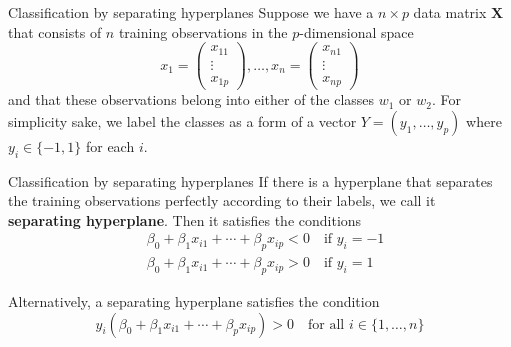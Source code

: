 \documentclass{beamer}
\begin{document}
\begin{frame}{Classification by separating hyperplanes}
	Suppose we have a $n\times p$ data matrix $\mathbf{X}$ that consists of $n$ training observations in the $p$-dimensional space
	\begin{equation*}
		x_1 = \begin{pmatrix}
			x_{11}\\ \vdots \\x_{1p} 
		\end{pmatrix}, \ldots, 
	x_n = \begin{pmatrix}
		x_{n1}\\ \vdots \\x_{np} 
	\end{pmatrix}
	\end{equation*}
and that these observations belong into either of the classes $w_1$ or $w_2$. For simplicity sake, we label the classes as a form of a  vector $Y=(y_1,\ldots,y_p)$ where $y_i \in \{-1,1\}$ for each $i$.


\end{frame}

\begin{frame}{Classification by separating hyperplanes}
	If there is a hyperplane that separates the training observations perfectly according to their labels, we call it {\bf separating hyperplane}.  Then it satisfies the conditions
	\begin{equation*}
		\begin{split}
			&\beta_0 + \beta_1 x_{i1} + \cdots + \beta_p x_{ip}<0  \quad \textrm{if } y_i = -1\\
			&\beta_0 + \beta_1 x_{i1}+ \cdots + \beta_p x_{ip}>0  \quad \textrm{if } y_i =1
		\end{split}
	\end{equation*}

Alternatively, a separating hyperplane satisfies the condition
\begin{equation*}
	y_i \left( \beta_0 + \beta_1 x_{i1} + \cdots + \beta_p x_{ip} \right)  >0  \quad \textrm{for all  } i \in \{1,\ldots,n\}
\end{equation*}
\end{frame}
\end{document}
